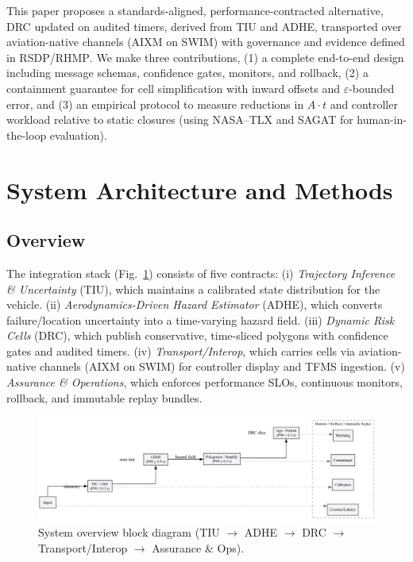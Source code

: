 \documentclass[journal]{new-aiaa}
\newcommand{\At}{\ensuremath{A\cdot t}}
\newcommand{\DRC}{\textsc{DRC}}
\newcommand{\TIU}{\textsc{TIU}}
\newcommand{\ADHE}{\textsc{ADHE}}
\newcommand{\RSDP}{\textsc{RSDP}}
\newcommand{\RHMP}{\textsc{RHMP}}
\newcommand{\AIXM}{\textsc{AIXM}}
\newcommand{\SWIM}{\textsc{SWIM}}
\begin{document}
This paper proposes a standards-aligned, performance-contracted alternative, \DRC{} updated on audited timers, derived from \TIU{} and \ADHE{}, transported over aviation-native channels (\AIXM{} on \SWIM{}) with governance and evidence defined in \RSDP/\RHMP.\cite{AIXM} We make three contributions, (1) a complete end-to-end design including message schemas, confidence gates, monitors, and rollback, (2) a containment guarantee for cell simplification with inward offsets and $\varepsilon$-bounded error,\cite{DouglasPeucker} and (3) an empirical protocol to measure reductions in \At{} and controller workload relative to static closures (using NASA--TLX and SAGAT for human-in-the-loop evaluation).\cite{NASA_TLX,Endsley_SAGAT}

\section{System Architecture and Methods}

\subsection{Overview}
The integration stack (Fig.~\ref{fig:blockdiag}) consists of five contracts:
(i) \emph{Trajectory Inference \& Uncertainty} (TIU), which maintains a calibrated state distribution for the vehicle.
(ii) \emph{Aerodynamics-Driven Hazard Estimator} (ADHE), which converts failure/location uncertainty into a time-varying hazard field.
(iii) \emph{Dynamic Risk Cells} (DRC), which publish conservative, time-sliced polygons with confidence gates and audited timers.
(iv) \emph{Transport/Interop}, which carries cells via aviation-native channels (AIXM on SWIM) for controller display and TFMS ingestion.
(v) \emph{Assurance \& Operations}, which enforces performance SLOs, continuous monitors, rollback, and immutable replay bundles.

\begin{figure}[t]
  \centering
  \includegraphics[width=0.85\linewidth]{blockdiag.png}
  \caption{System overview block diagram (TIU $\to$ ADHE $\to$ DRC $\to$ Transport/Interop $\to$ Assurance \& Ops).}
  \label{fig:blockdiag}
\end{figure}
\end{document}
